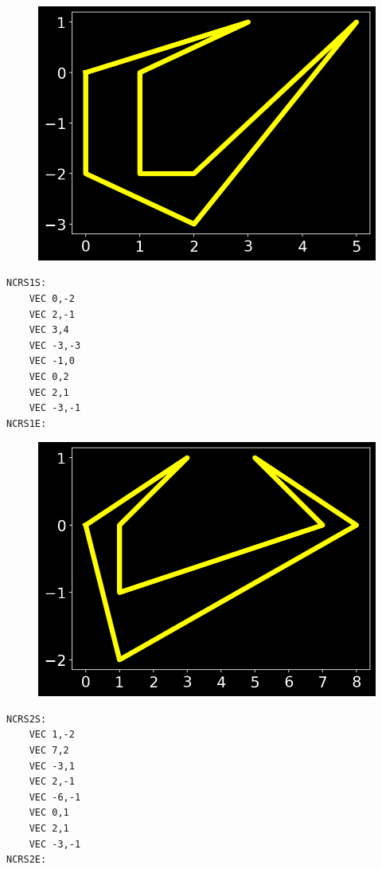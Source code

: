 \begin{minipage}[b]{0.48\linewidth}
\begin{figure}[H]
    \centering
    \begin{adjustbox}{width=4.5cm,center}
      \includegraphics[width=12cm]{src/cursors/final_cursor_0.png}%
    \end{adjustbox}
\end{figure}
\end{minipage}
\begin{minipage}[b]{0.48\linewidth}
\begin{lstlisting}
NCRS1S:
	VEC 0,-2
	VEC 2,-1
	VEC 3,4
	VEC -3,-3
	VEC -1,0
	VEC 0,2
	VEC 2,1
	VEC -3,-1
NCRS1E:
\end{lstlisting}
\end{minipage}

\begin{minipage}[b]{0.48\linewidth}
\begin{figure}[H]
    \centering
    \begin{adjustbox}{width=4.5cm,center}
      \includegraphics[width=12cm]{src/cursors/final_cursor_1.png}%
    \end{adjustbox}
\end{figure}
\end{minipage}
\begin{minipage}[b]{0.48\linewidth}
\begin{lstlisting}
NCRS2S:
	VEC 1,-2
	VEC 7,2
	VEC -3,1
	VEC 2,-1
	VEC -6,-1
	VEC 0,1
	VEC 2,1
	VEC -3,-1
NCRS2E:
\end{lstlisting}
\end{minipage}

